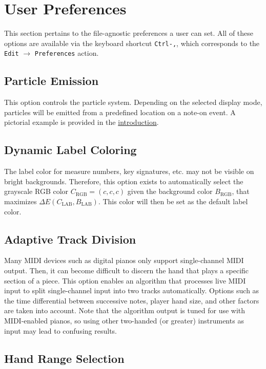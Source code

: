 \documentclass[english]{article}
\providecommand{\mi}[1]{\texttt{#1}}
\begin{document}
\section{User Preferences}

This section pertains to the file-agnostic preferences a user can set.
All of these options are available via the keyboard shortcut \mi{Ctrl-,},
which corresponds to the \mi{Edit} $\rightarrow$ \mi{Preferences} action.

\subsection{Particle Emission}

This option controls the particle system. Depending on the selected display mode, particles will be emitted from a 
predefined location on a note-on event. A pictorial example is provided in the 
\textcolor{lcol}{\hyperref[sec:intro]{introduction}}.

\subsection{Dynamic Label Coloring}

The label color for measure numbers, key signatures, etc. may not be visible on bright backgrounds. Therefore,
this option exists to automatically select the grayscale RGB color $C_\text{RGB}=(c,c,c)$
given the background color $B_\text{RGB}$,
that maximizes $\Delta E(C_\text{LAB}, B_\text{LAB})$.
This color will then be set as the default label color.

\subsection{Adaptive Track Division}

Many MIDI devices such as digital pianos only support single-channel MIDI output. Then, it can become difficult to discern the
hand that plays a specific section of a piece. This option enables an algorithm that processes live MIDI input to split
single-channel input into two tracks automatically. Options such as the time differential between successive notes, 
player hand size, and other factors are taken into account. Note that the algorithm output is tuned for use with MIDI-enabled
pianos, so using other two-handed (or greater) instruments as input may lead to confusing results.

\subsection{Hand Range Selection}
\end{document}
